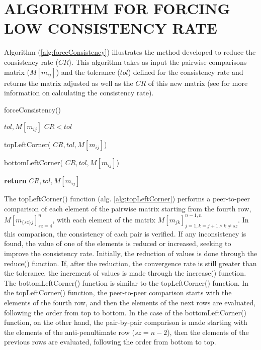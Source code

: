 \documentclass[10pt,fleqn,a4paper,twoside]{article}
\begin{document}
    \section{ALGORITHM FOR FORCING LOW CONSISTENCY RATE}
    
    Algorithm (\ref{alg:forceConsistency}) illustrates the method developed to reduce the consistency rate ($CR$). This algorithm takes as input the pairwise comparisons matrix ($M[m_{ij}]$) and the tolerance ($tol$) defined for the consistency rate and returns the matrix adjusted as well as the $CR$ of this new matrix (see \cite{Saaty1987} for more information on calculating the consistency rate).
    
\begin{algorithm}
\caption{forceConsistency()}\label{alg:forceConsistency}
	\begin{algorithmic}
	\Require $tol, M[m_{ij}]$
	\Ensure $CR < tol$

	
	\State topLeftCorner( $CR, tol, M[m_{ij}]$)
	
	\State bottomLeftCorner( $CR, tol, M[m_{ij}]$)
	
	\State \textbf{return} $CR, tol, M[m_{ij}]$
	
\end{algorithmic}
\end{algorithm}

The topLeftCorner() function (alg. \ref{alg:topLeftCorner}) performs a peer-to-peer comparison of each element of the pairwise matrix starting from the fourth row, $M[m_{\{sz\}j}]_{sz=4}^{n}$, with each element of the matrix $M[m_{jk}]_{j=1, k=j+1 \land k \neq sz}^{n-1,n}$. In this comparison, the consistency of each pair is verified. If any inconsistency is found, the value of one of the elements is reduced or increased, seeking to improve the consistency rate. Initially, the reduction of values is done through the reduce() function.  If, after the reduction, the convergence rate is still greater than the tolerance, the increment of values is made through the increase() function. The bottomLeftCorner() function is similar to the topLeftCorner() function. In the topLeftCorner() function, the peer-to-peer comparison starts with the elements of the fourth row, and then the elements of the next rows are evaluated, following the order from top to bottom. In the case of the bottomLeftCorner() function, on the other hand, the pair-by-pair comparison is made starting with the elements of the anti-penultimate row ($sz = n-2$), then the elements of the previous rows are evaluated, following the order from bottom to top.
\end{document}
